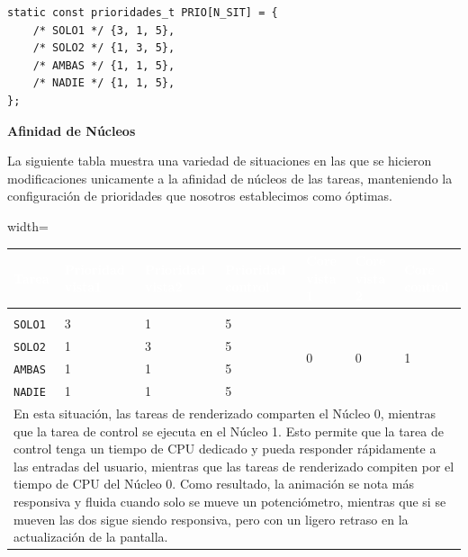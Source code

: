 \documentclass[12pt, letterpaper]{article}
\begin{document}
\begin{lstlisting}[style=cstyle, caption={Distribución de prioridades en la situación 2}, label={lst:prioridades-situacion2}]
static const prioridades_t PRIO[N_SIT] = {
    /* SOLO1 */ {3, 1, 5},
    /* SOLO2 */ {1, 3, 5},
    /* AMBAS */ {1, 1, 5},
    /* NADIE */ {1, 1, 5},
};
\end{lstlisting}

\textbf{Afinidad de Núcleos}

La siguiente tabla muestra una variedad de situaciones en las que se hicieron modificaciones unicamente a la afinidad de núcleos de las tareas, manteniendo la configuración de prioridades que nosotros establecimos como óptimas.

\begin{table}[H]
\begin{adjustbox}{width=\textwidth}
    \renewcommand{\arraystretch}{1.2}
    \begin{tabular}{|l|l|l|l|l|l|l|}
        \hline
        \rowcolor{MidnightBlue!80}
        \textcolor{white}{\textbf{Tarea}} & \textcolor{white}{\textbf{Prioridad vista1}} & \textcolor{white}{\textbf{Prioridad vista2}} & \textcolor{white}{\textbf{Prioridad control}} & \textcolor{white}{\textbf{Core vista 1}} & \textcolor{white}{\textbf{Core vista 2}} & \textcolor{white}{\textbf{Core control}} \\
        \hline
        \rowcolor{NavyBlue!80}
        \multicolumn{7}{|c|}{\textbf{Situación 1}} \\
        \hline
        \texttt{SOLO1} & 3 & 1 & 5 & \multirow{4}{*}{0} & \multirow{4}{*}{0} & \multirow{4}{*}{1} \\
        \texttt{SOLO2} & 1 & 3 & 5 &  &  &  \\
        \texttt{AMBAS} & 1 & 1 & 5 &  &  &  \\
        \texttt{NADIE} & 1 & 1 & 5 &  &  &  \\
        \hline
        \multicolumn{7}{|p{\textwidth}|}{
            En esta situación, las tareas de renderizado comparten el Núcleo 0, mientras que la tarea de control se ejecuta en el Núcleo 1. Esto permite que la tarea de control tenga un tiempo de CPU dedicado y pueda responder rápidamente a las entradas del usuario, mientras que las tareas de renderizado compiten por el tiempo de CPU del Núcleo 0. Como resultado, la animación se nota más responsiva y fluida cuando solo se mueve un potenciómetro, mientras que si se mueven las dos sigue siendo responsiva, pero con un ligero retraso en la actualización de la pantalla.
        } \\

\end{tabular}
\end{adjustbox}
\end{table}
\end{document}
